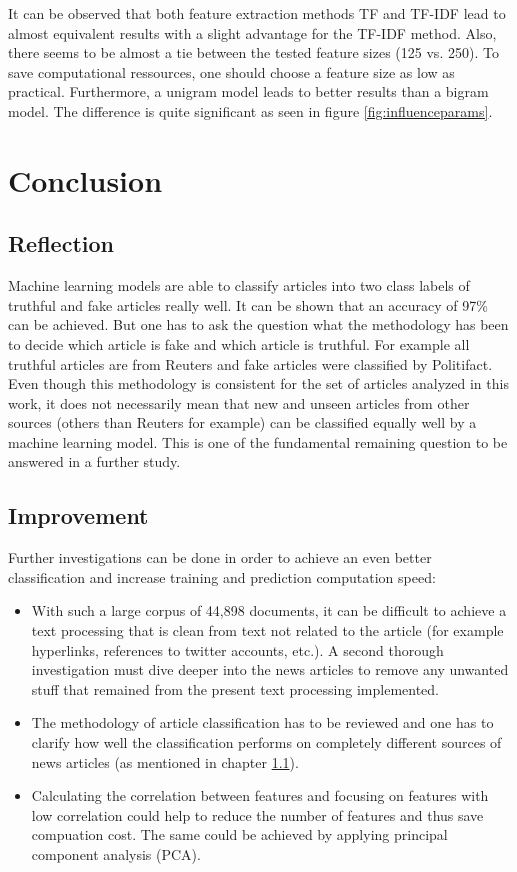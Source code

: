 \documentclass[a4paper,12pt,nottoc]{article}
\begin{document}
\noindent It can be observed that both feature extraction methods TF and TF-IDF lead to almost equivalent results with a slight advantage for the TF-IDF method. Also, there seems to be almost a tie between the tested feature sizes (125 vs. 250). To save computational ressources, one should choose a feature size as low as practical. Furthermore, a unigram model leads to better results than a bigram model. The difference is quite significant as seen in figure \ref{fig:influenceparams}. 

\clearpage
\section{Conclusion} 

\subsection{Reflection}\label{chap:reflection}

Machine learning models are able to classify articles into two class labels of truthful and fake articles really well. It can be shown that an accuracy of 97\% can be achieved. But one has to ask the question what the methodology has been to decide which article is fake and which article is truthful. For example all truthful articles are from Reuters and fake articles were classified by Politifact. Even though this methodology is consistent for the set of articles analyzed in this work, it does not necessarily mean that new and unseen articles from other sources (others than Reuters for example) can be classified equally well by a machine learning model. This is one of the fundamental remaining question to be answered in a further study.

\subsection{Improvement}

Further investigations can be done in order to achieve an even better classification and increase training and prediction computation speed:

\begin{itemize}
\item{With such a large corpus of 44,898 documents, it can be difficult to achieve a text processing that is clean from text not related to the article (for example hyperlinks, references to twitter accounts, etc.). A second thorough investigation must dive deeper into the news articles to remove any unwanted stuff that remained from the present text processing implemented.}
\item{The methodology of article classification has to be reviewed and one has to clarify how well the classification performs on completely different sources of news articles (as mentioned in chapter \ref{chap:reflection}).}
\item{Calculating the correlation between features and focusing on features with low correlation could help to reduce the number of features and thus save compuation cost. The same could be achieved by applying principal component analysis (PCA).}
\end{itemize}
\end{document}
